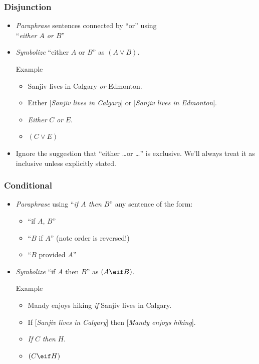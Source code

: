 \begin{frame}
  \frametitle{Disjunction}

  \begin{itemize}[<+->]
  \item \emph{Paraphrase} sentences connected by ``or'' using\\
  ``\emph{either $A$ or $B$}''

  \item \emph{Symbolize} ``either $A$ or $B$'' as
  \emph{$(A \lor B)$}.

  \begin{block}{Example}
  \begin{itemize}[<+->]
  \item[] Sanjiv lives in Calgary \emph{or} Edmonton.

  \item[] Either [\emph{Sanjiv lives in Calgary}] or [\emph{Sanjiv lives in Edmonton}].

  \item[] \emph{Either} $C$ \emph{or} $E$.

  \item[] $(C \lor E)$
  \end{itemize}
  \end{block}
  
  \item[] Ignore the suggestion that ``either \dots or \dots'' is exclusive.
  We'll always treat it as inclusive unless explicitly stated.
\end{itemize}

\end{frame}

\begin{frame}
  \frametitle{Conditional}

  \begin{itemize}[<+->]
  \item \emph{Paraphrase} using ``\emph{if $A$ then $B$}'' any sentence of the form:
  \begin{itemize}[<+->]
  \item ``if $A$, $B$''
  \item ``$B$ if $A$'' (note order is reversed!)
  \item ``$B$ provided $A$''
  \end{itemize}
  \item \emph{Symbolize} ``if $A$ then $B$'' as
  \emph{$(A \eif B)$}.

  \begin{block}{Example}
  \begin{itemize}[<+->]
  \item Mandy enjoys hiking \emph{if} Sanjiv lives in Calgary.

  \item If [\emph{Sanjiv lives in Calgary}] then [\emph{Mandy enjoys hiking}].

  \item \emph{If} $C$ \emph{then} $H$.

  \item $(C \eif H)$
  \end{itemize}
  \end{block}
  \end{itemize}
\end{frame}

